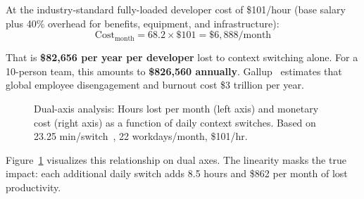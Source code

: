 \documentclass[11pt, twocolumn]{article}
\begin{document}
At the industry-standard fully-loaded developer cost of \$101/hour (base salary plus 40\% overhead for benefits, equipment, and infrastructure):
\begin{equation}
\text{Cost}_{\text{month}} = 68.2 \times \$101 = \$6,888/\text{month}
\label{eq:cost_month}
\end{equation}

That is \textbf{\$82,656 per year per developer} lost to context switching alone. For a 10-person team, this amounts to \textbf{\$826,560 annually}. Gallup~\cite{gallup2023burnout} estimates that global employee disengagement and burnout cost \$3 trillion per year.

\begin{figure}[t]
\centering
{}
\caption{Dual-axis analysis: Hours lost per month (left axis) and monetary cost (right axis) as a function of daily context switches. Based on 23.25 min/switch~\cite{mark2008cost}, 22 workdays/month, \$101/hr.}
\label{fig:dualaxis}
\end{figure}

Figure~\ref{fig:dualaxis} visualizes this relationship on dual axes. The linearity masks the true impact: each additional daily switch adds 8.5 hours and \$862 per month of lost productivity.
\end{document}
